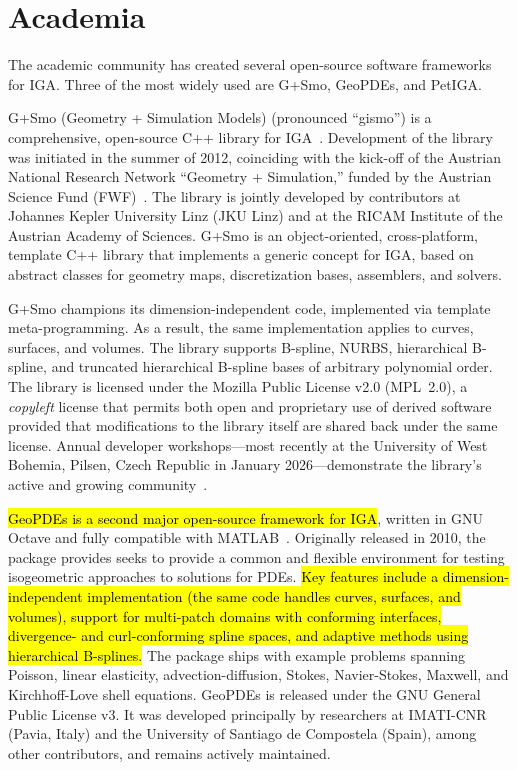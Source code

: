 \documentclass[12pt,report,justified]{SANDreport}
\begin{document}
\section{Academia}

The academic community has created several open-source software frameworks for IGA.  Three of the most widely used are G+Smo, GeoPDEs, and PetIGA.

G+Smo (Geometry + Simulation Models) (pronounced ``gismo'') is a comprehensive, open-source C++ library for IGA~\cite{Juttler2014GSmo}.  Development of the library was initiated in the summer of 2012, coinciding with the kick-off of the Austrian National Research Network ``Geometry + Simulation,'' funded by the Austrian Science Fund (FWF)~\cite{GSmoWiki2024}.  The library is jointly developed by contributors at Johannes Kepler University Linz (JKU Linz) and at the RICAM Institute of the Austrian Academy of Sciences.  G+Smo is an object-oriented, cross-platform, template C++ library that implements a generic concept for IGA, based on abstract classes for geometry maps, discretization bases, assemblers, and solvers.  

G+Smo champions its dimension-independent code, implemented via template meta-programming.  As a result, the same implementation applies to curves, surfaces, and volumes.  The library supports B-spline, NURBS, hierarchical B-spline, and truncated hierarchical B-spline bases of arbitrary polynomial order.  The library is licensed under the Mozilla Public License v2.0 (MPL~2.0), a \emph{copyleft} license that permits both open and proprietary use of derived software provided that modifications to the library itself are shared back under the same license.  Annual developer workshops---most recently at the University of West Bohemia, Pilsen, Czech Republic in January 2026---demonstrate the library's active and growing community~\cite{GSmoWiki2024}.

\hl{GeoPDEs is a second major open-source framework for IGA}, written in GNU Octave and fully compatible with MATLAB~\cite{deFalco2011GeoPDEs,Vazquez2016GeoPDEs}.  Originally released in 2010, the package provides seeks to provide a common and flexible environment for testing isogeometric approaches to solutions for PDEs. \hl{Key features include a dimension-independent implementation (the same code handles curves, surfaces, and volumes), support for multi-patch domains with conforming interfaces, divergence- and curl-conforming spline spaces, and adaptive methods using hierarchical B-splines.}  The package ships with example problems spanning Poisson, linear elasticity, advection-diffusion, Stokes, Navier-Stokes, Maxwell, and Kirchhoff-Love shell equations.  GeoPDEs is released under the GNU General Public License v3.  It was developed principally by researchers at IMATI-CNR (Pavia, Italy) and the University of Santiago de Compostela (Spain), among other contributors, and remains actively maintained.
\end{document}
